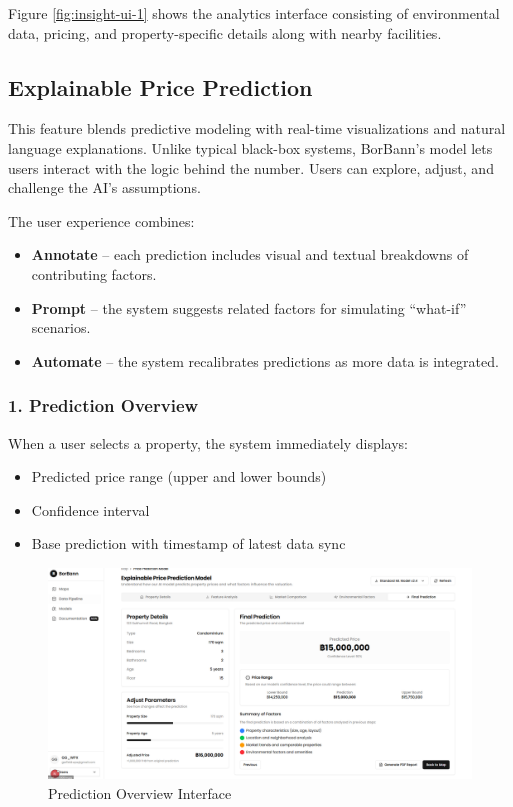 Figure \ref{fig:insight-ui-1} shows the analytics interface consisting of environmental data, pricing, and property-specific details along with nearby facilities.

\subsection{Explainable Price Prediction}

This feature blends predictive modeling with real-time visualizations and natural language explanations. Unlike typical black-box systems, BorBann’s model lets users interact with the logic behind the number. Users can explore, adjust, and challenge the AI's assumptions.

The user experience combines:

\begin{itemize}
	\item \textbf{Annotate} – each prediction includes visual and textual breakdowns of contributing factors.
	\item \textbf{Prompt} – the system suggests related factors for simulating “what-if” scenarios.
	\item \textbf{Automate} – the system recalibrates predictions as more data is integrated.
\end{itemize}

\subsubsection*{1. Prediction Overview}

When a user selects a property, the system immediately displays:

\begin{itemize}
	\item Predicted price range (upper and lower bounds)
	\item Confidence interval
	\item Base prediction with timestamp of latest data sync
\end{itemize}

\begin{figure}[htbp]
	\centering
	\includegraphics[width=1\textwidth]{assets/ai/price-prediction-1.png}
	\caption{Prediction Overview Interface}
	\label{fig:price-prediction-ui-1}
\end{figure}

